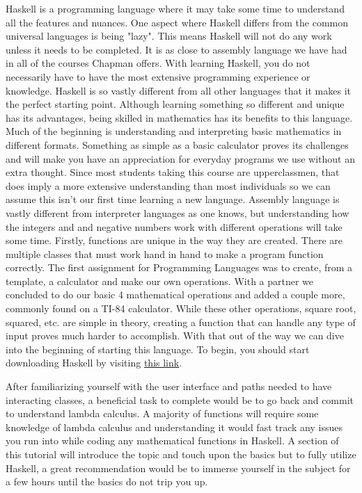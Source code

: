 \documentclass{article}
\begin{document}
Haskell is a programming language where it may take some time to understand all the features and nuances. One aspect where Haskell differs from the common universal languages is being "lazy". This means Haskell will not do any work unless it needs to be completed. It is as close to assembly language we have had in all of the courses Chapman offers. With learning Haskell, you do not necessarily have to have the most extensive programming experience or knowledge. Haskell is so vastly different from all other languages that it makes it the perfect starting point. Although learning something so different and unique has its advantages, being skilled in mathematics has its benefits to this language. Much of the beginning is understanding and interpreting basic mathematics in different formats. Something as simple as a basic calculator proves its challenges and will make you have an appreciation for everyday programs we use without an extra thought. Since most students taking this course are upperclassmen, that does imply a more extensive understanding than most individuals so we can assume this isn’t our first time learning a new language. Assembly language is vastly different from interpreter languages as one knows, but understanding how the integers and and negative numbers work with different operations will take some time. Firstly, functions are unique in the way they are created. There are multiple classes that must work hand in hand to make a program function correctly. The first assignment for Programming Languages was to create, from a template, a calculator and make our own operations. With a partner we concluded to do our basic 4 mathematical operations and added a couple more, commonly found on a TI-84 calculator. While these other operations, square root, squared, etc. are simple in theory, creating a function that can handle any type of input proves much harder to accomplish. With that out of the way we can dive into the beginning of starting this language. To begin, you should start downloading Haskell by visiting \href{https://hackmd.io/@alexhkurz/Hk86XnCzD}{this link}.

\medskip\noindent
After familiarizing yourself with the user interface and paths needed to have interacting classes, a beneficial task to complete would be to go back and commit to understand lambda calculus. A majority of functions will require some knowledge of lambda calculus and understanding it would fast track any issues you run into while coding any mathematical functions in Haskell. A section of this tutorial will introduce the topic and touch upon the basics but to fully utilize Haskell, a great recommendation would be to immerse yourself in the subject for a few hours until the basics do not trip you up.
\end{document}
